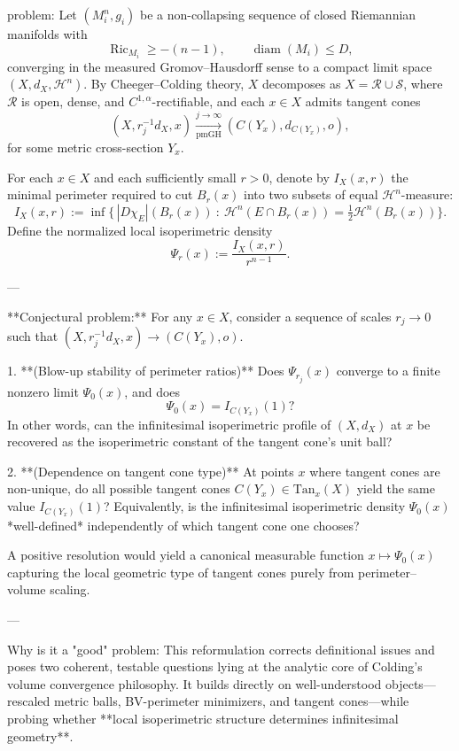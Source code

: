 problem:  
Let \((M_i^n,g_i)\) be a non-collapsing sequence of closed Riemannian manifolds with  
\[
\operatorname{Ric}_{M_i}\ge -(n-1),\qquad  \operatorname{diam}(M_i)\le D,
\]
converging in the measured Gromov–Hausdorff sense to a compact limit space \((X,d_X,\mathcal{H}^n)\).  
By Cheeger–Colding theory, \(X\) decomposes as \(X=\mathcal{R}\cup \mathcal{S}\), where \(\mathcal{R}\) is open, dense, and \(C^{1,\alpha}\)-rectifiable, and each \(x\in X\) admits tangent cones
\[
(X,r_j^{-1}d_X,x)\xrightarrow[\text{pmGH}]{j\to\infty}(C(Y_x),d_{C(Y_x)},o),
\]
for some metric cross-section \(Y_x\).

For each \(x\in X\) and each sufficiently small \(r>0\), denote by \(I_X(x,r)\) the minimal perimeter required to cut \(B_r(x)\) into two subsets of equal \(\mathcal{H}^n\)-measure:
\[
I_X(x,r):=\inf\big\{\,|D\chi_E|(B_r(x)) \ :\ \mathcal{H}^n(E\cap B_r(x))=\tfrac{1}{2}\mathcal{H}^n(B_r(x)) \big\}.
\]
Define the normalized local isoperimetric density
\[
\Psi_r(x) := \frac{I_X(x,r)}{r^{n-1}}.
\]

---

**Conjectural problem:**  
For any \(x\in X\), consider a sequence of scales \(r_j\to0\) such that \((X, r_j^{-1}d_X, x)\to (C(Y_x),o)\).  

1. **(Blow-up stability of perimeter ratios)**  
   Does \(\Psi_{r_j}(x)\) converge to a finite nonzero limit \(\Psi_0(x)\), and does  
   \[
   \Psi_0(x)=I_{C(Y_x)}(1)?
   \]
   In other words, can the infinitesimal isoperimetric profile of \((X,d_X)\) at \(x\) be recovered as the isoperimetric constant of the tangent cone’s unit ball?

2. **(Dependence on tangent cone type)**  
   At points \(x\) where tangent cones are non-unique, do all possible tangent cones \(C(Y_x)\in \mathrm{Tan}_x(X)\) yield the same value \(I_{C(Y_x)}(1)\)?  
   Equivalently, is the infinitesimal isoperimetric density \(\Psi_0(x)\) *well-defined* independently of which tangent cone one chooses?

A positive resolution would yield a canonical measurable function \(x\mapsto \Psi_0(x)\) capturing the local geometric type of tangent cones purely from perimeter–volume scaling.

---

Why is it a "good" problem:  
This reformulation corrects definitional issues and poses two coherent, testable questions lying at the analytic core of Colding’s volume convergence philosophy. It builds directly on well-understood objects—rescaled metric balls, BV-perimeter minimizers, and tangent cones—while probing whether **local isoperimetric structure determines infinitesimal geometry**.  

